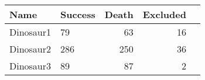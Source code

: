 \begin{tabular}{llrrr}
\toprule
Name & Success & Death & Excluded \\
\midrule
Dinosaur1  &   79 &   63 &  16 \\
Dinosaur2  &  286 &  250 &  36 \\
Dinosaur3  &   89 &   87 &   2 \\
\bottomrule
\end{tabular}
